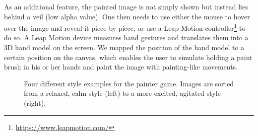 \documentclass{utue} %
\begin{document}
As an additional feature, the painted image is not simply shown but instead lies behind a veil (low alpha value). One then needs to use either the mouse to hover over the image and reveal it piece by piece, or use a Leap Motion controller\footnote{\url{https://www.leapmotion.com/}} to do so. A Leap Motion device measures hand gestures and translates them into a 3D hand model on the screen. We mapped the position of the hand model to a certain position on the canvas, which enables the user to simulate holding a paint brush in his or her hands and paint the image with painting-like movements.

\begin{figure}
	\centering
	\hspace{0.02\columnwidth}
	\hspace{0.02\columnwidth}
	\hspace{0.02\columnwidth}
	\caption{Four different style examples for the painter game. Images are sorted from a relaxed, calm style (left) to a more excited, agitated style (right).}
	\label{fig:painter_styles}
\end{figure}
\end{document}
